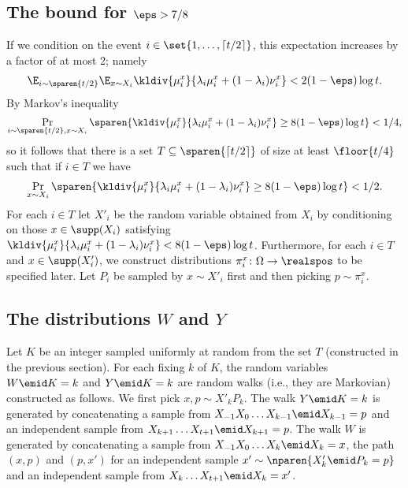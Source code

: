 \subsection{The bound for $\eps> 7/8$}
If we condition on the event $i\in\set{1,\ldots,\lceil t/2 \rceil}$, this expectation
increases by a factor of at most 2; namely
\begin{align*}
\E_{i\sim \sparen{t/2}}
  \E_{x\sim X_i}
      \kldiv{\mu_i^x}
      {\lambda_i \mu_i^x 
          + (1-\lambda_i)\nu^x_i} < 2(1-\eps)\log t.
\end{align*}
By Markov's inequality
\begin{align*}
\Pr_{i\sim\sparen{t/2},x\sim X_i}
  \sparen{\kldiv{\mu_i^x}
      {\lambda_i \mu_i^x 
          + (1-\lambda_i)\nu^x_i} \ge 8(1-\eps)\log t} < 1/4,
\end{align*}
so it follows that there is a set 
$T\subseteq\sparen{\lceil t/2\rceil}$ of size
at least $\floor{t/4}$ such that if $i\in T$ we have
\begin{align}
\Pr_{x\sim X_i}
  \sparen{\kldiv{\mu_i^x}
      {\lambda_i \mu_i^x 
          + (1-\lambda_i)\nu_i^x} \ge 8(1-\eps)\log t} < 1/2.
          \label{eq:halfp}
\end{align}
For each $i\in T$ let $X'_i$ be the random variable 
obtained from $X_i$ by conditioning on those 
$x\in \supp(X_i)$ satisfying $\kldiv{\mu_i^x}
{\lambda_i \mu_i^x + (1-\lambda_i)\nu^x_i}<8(1-\eps)\log t$.
Furthermore, for each $i\in T$ and $x\in\supp(X'_i)$,
we construct distributions
$\pi_i^x\colon \Omega\to\realspos$ to be specified later.
Let $P_i$ be sampled by $x\sim X'_i$ first and then picking
$p\sim \pi_i^x$. 

\subsection{The distributions $W$ and $Y$}
Let $K$ be an integer sampled uniformly at
random from the set $T$ (constructed in 
the previous section).
For each fixing $k$ of $K$, the random variables $W\emid K=k$
and $Y\emid K=k$ are random walks 
(i.e., they are Markovian) 
constructed as follows. We first pick $x,p\sim X'_kP_k$.
The walk $Y\emid K=k$ is generated by concatenating a sample
from $X_{-1}X_0\ldots X_{k-1}\emid X_{k-1} = p$ and 
an independent sample from $X_{k+1}\ldots X_{t+1}\emid X_{k+1} = p$.
The walk $W$ is generated by concatenating a sample from 
$X_{-1}X_0\ldots X_{k}\emid X_{k} = x$, the path
$(x, p)$ and $(p,x')$ for an independent sample 
$x'\sim\nparen{X'_k\emid P_k = p}$ and 
an independent sample from $X_{k}\ldots X_{t+1}\emid X_{k} = x'$.


